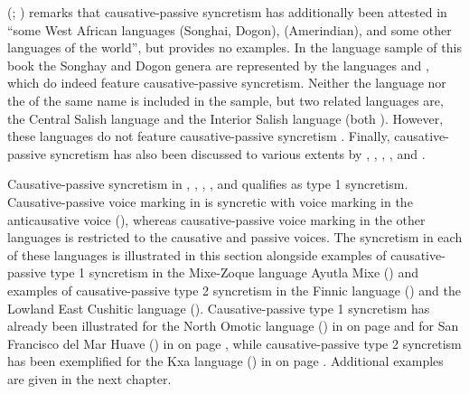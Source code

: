 \newpage

\citeauthor{kulikov:2001} (\citeyear[894]{kulikov:2001}; \citeyear[394]{kulikov:2010}) remarks that causative-passive syncretism has additionally been attested in “some West African languages (Songhai, Dogon),  (Amerindian), and some other languages of the world”, but provides no examples. In the language sample of this book the Songhay and Dogon genera are represented by the languages  and , which do indeed feature causative-passive syncretism. Neither the language  nor the  of the same name is included in the sample, but two related languages are, the Central Salish language  and the Interior Salish language  (both ). However, these languages do not feature causative-passive syncretism \citep{suttles:2004, willett:2003}. Finally, causative-passive syncretism has also been discussed to various extents by \citet[840]{shibatani:1985}, \citet[46ff.]{haspelmath:1990}, \citet{knott:1995}, \citet[31]{dixon:2000}, and \citet[400ff.]{malchukov:2016}.

Causative-passive syncretism in , , , , and  qualifies as type 1 syncretism. Causative-passive voice marking in  is syncretic with voice marking in the anticausative voice (), whereas causative-passive voice marking in the other languages is restricted to the causative and passive voices. The syncretism in each of these languages is illustrated in this section alongside examples of causative-passive type 1 syncretism in the Mixe-Zoque language Ayutla Mixe () and examples of causative-passive type 2 syncretism in the Finnic language  () and the Lowland East Cushitic language  (). Causative-passive type 1 syncretism has already been illustrated for the North Omotic language  () in  on page \pageref{tab:ch3:type1b-examples-1} and for San Francisco del Mar Huave () in  on page \pageref{tab:ch3:type1b-examples-2}, while causative-passive type 2 syncretism has been exemplified for the Kxa language  () in  on page \pageref{tab:ch3:type2-examples}. Additional examples are given in the next chapter. 

